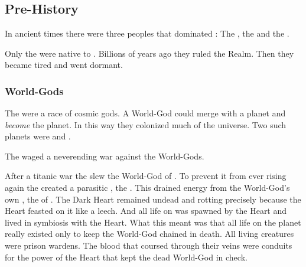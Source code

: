 















\chapter{\FirstbanewarBook}















\section{Pre-History}
In ancient times there were three peoples that dominated \Miith{}: 
The \krakens, the \xss{} and the \voyagers. 

Only the \krakens{} were native to \Miith{}. 
Billions of years ago they ruled the Realm. 
Then they became tired and went dormant. 









\subsection{World-Gods}
The  were a race of cosmic gods.
A World-God could merge with a planet and \emph{become} the planet.
In this way they colonized much of the universe.
Two such planets were \Miith and \Erebos. 

The \voyagers waged a neverending war against the World-Gods.

After a titanic war the \voyagers slew the World-God of \Miith.
To prevent it from ever rising again the \voyagers created a parasitic \dweomer, the .
This \dweomer drained energy from the World-God's own \dweomer, the  of \Miith. 
The Dark Heart remained undead and rotting precisely because the Heart feasted on it like a leech.
And all life on \Miith was spawned by the Heart and lived in symbiosis with the Heart.
What this meant was that all life on the planet really existed only to keep the World-God chained in death. 
All living creatures were prison wardens. 
The blood that coursed through their veins were conduits for the power of the Heart that kept the dead World-God in check.

